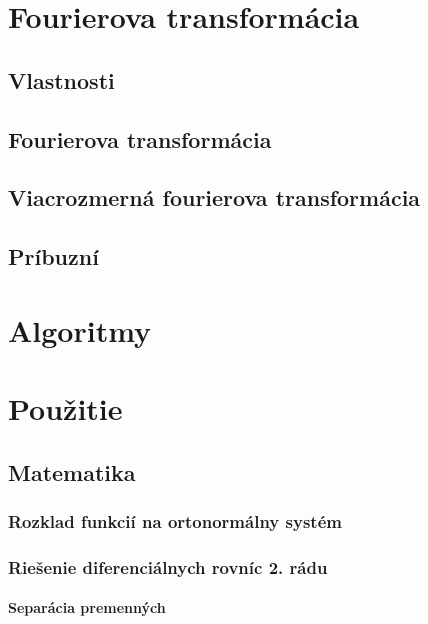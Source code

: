 



\chapter{Fourierova transformácia}
    
    
    
\section{Vlastnosti}
\section{Fourierova transformácia}
\section{Viacrozmerná fourierova transformácia}
\section{Príbuzní}

\chapter{Algoritmy}
    
    
    
    
    
    
    
    
    
    

\chapter{Použitie}
\section{Matematika}
    \subsection{Rozklad funkcií na ortonormálny systém}
    
    \subsection{Riešenie diferenciálnych rovníc 2. rádu}    
        \subsubsection{Separácia premenných}
    
         
